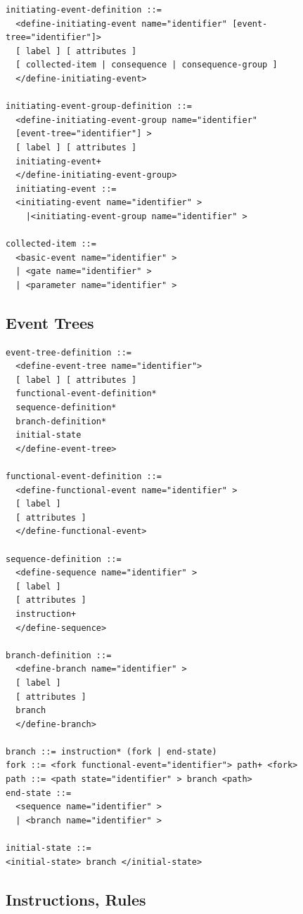 \documentclass[11pt]{article}
\begin{document}
\lstset{language=[LaTeX]TeX,label= ,caption= ,captionpos=b,numbers=none}
\begin{lstlisting}
initiating-event-definition ::=
  <define-initiating-event name="identifier" [event-tree="identifier"]>
  [ label ] [ attributes ]
  [ collected-item | consequence | consequence-group ]
  </define-initiating-event>

initiating-event-group-definition ::=
  <define-initiating-event-group name="identifier"
  [event-tree="identifier"] >
  [ label ] [ attributes ]
  initiating-event+
  </define-initiating-event-group>
  initiating-event ::=
  <initiating-event name="identifier" >
    |<initiating-event-group name="identifier" >

collected-item ::=
  <basic-event name="identifier" >
  | <gate name="identifier" >
  | <parameter name="identifier" >
\end{lstlisting}

\subsection{Event Trees}
\label{sec:org3fc964b}


\lstset{language=[LaTeX]TeX,label= ,caption= ,captionpos=b,numbers=none}
\begin{lstlisting}
event-tree-definition ::=
  <define-event-tree name="identifier">
  [ label ] [ attributes ]
  functional-event-definition*
  sequence-definition*
  branch-definition*
  initial-state
  </define-event-tree>

functional-event-definition ::=
  <define-functional-event name="identifier" >
  [ label ]
  [ attributes ]
  </define-functional-event>

sequence-definition ::=
  <define-sequence name="identifier" >
  [ label ]
  [ attributes ]
  instruction+
  </define-sequence>

branch-definition ::=
  <define-branch name="identifier" >
  [ label ]
  [ attributes ]
  branch
  </define-branch>

branch ::= instruction* (fork | end-state)
fork ::= <fork functional-event="identifier"> path+ <fork>
path ::= <path state="identifier" > branch <path>
end-state ::=
  <sequence name="identifier" >
  | <branch name="identifier" >

initial-state ::=
<initial-state> branch </initial-state>
\end{lstlisting}

\subsection{Instructions, Rules}
\label{sec:orga2768e6}
\end{document}
